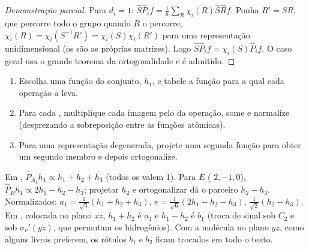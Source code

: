 \begin{proof}[Demonstração parcial]
Para $d_i = 1$: $\hat S\hat P_if = \frac1h\sum_R\chi_i(R)\hat S\hat Rf$. Ponha $R' = SR$,
que percorre todo o grupo quando $R$ o percorre; $\chi_i(R) = \chi_i(S^{-1}R') =
\chi_i(S)\chi_i(R')$ para uma representação unidimensional (os  são
as próprias matrizes). Logo $\hat S\hat P_if = \chi_i(S)\hat P_if$. O caso
geral usa o grande teorema da ortogonalidade e é admitido.
\end{proof}

\begin{method}\label{met:b3:group-theory-applied:salc}
\begin{enumerate}
  \item Escolha uma função do conjunto, $h_1$, e tabele a função para a qual
        cada operação a leva.
  \item Para cada , multiplique cada imagem pelo
         da operação, some e normalize (desprezando a sobreposição
        entre as funções atômicas).
  \item Para uma representação degenerada, projete uma segunda função para
        obter um segundo membro e depois ortogonalize.
\end{enumerate}
\end{method}

\begin{example}\label{ex:b3:group-theory-applied:salcs}
Em , $\hat P_{A_1}h_1 \propto h_1 + h_2 + h_3$ (todos os  valem 1). Para $E$
( $2, -1, 0$), $\hat P_Eh_1 \propto 2h_1 - h_2 - h_3$; projetar $h_2$ e
ortogonalizar dá o parceiro $h_2 - h_3$. Normalizados: $a_1 =
\frac{1}{\sqrt3}(h_1 + h_2 + h_3)$, $e = \frac{1}{\sqrt6}(2h_1 - h_2 - h_3)$,
$\frac{1}{\sqrt2}(h_2 - h_3)$. Em , colocada no plano $xz$, $h_1 + h_2$ é
$a_1$ e $h_1 - h_2$ é $b_1$ (troca de sinal sob $C_2$ e sob $\sigma_v'(yz)$,
que permutam os hidrogênios). Com a molécula no plano $yz$, como alguns
livros preferem, os rótulos $b_1$ e $b_2$ ficam trocados em todo o texto.
\end{example}

